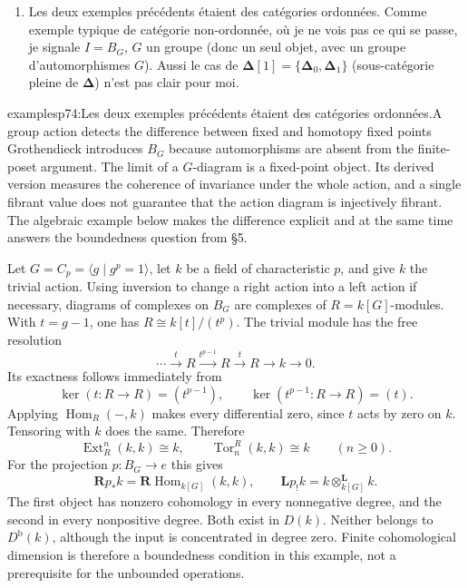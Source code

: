 \begin{enumerate}
\item[\textit{c})] Les deux exemples précédents étaient des catégories ordonnées. Comme exemple typique de catégorie non-ordonnée, où je ne vois pas ce qui se passe, je signale $I = B_G$, $G$ un groupe (donc un seul objet, avec un groupe d'automorphismes $G$). Aussi le cas de $\boldsymbol{\Delta}[1] = \{\boldsymbol{\Delta}_0, \boldsymbol{\Delta}_1\}$ (sous-catégorie pleine de $\boldsymbol{\Delta}$) n'est pas clair pour moi.
\end{enumerate}

\begin{dcomment}{examples}{p74:Les deux exemples précédents étaient des catégories ordonnées.}{A group action detects the difference between fixed and homotopy fixed points}
Grothendieck introduces $B_G$ because automorphisms are absent from the finite-poset argument. The limit of a $G$-diagram is a fixed-point object. Its derived version measures the coherence of invariance under the whole action, and a single fibrant value does not guarantee that the action diagram is injectively fibrant. The algebraic example below makes the difference explicit and at the same time answers the boundedness question from \S5.

Let $G=C_p=\langle g\mid g^p=1\rangle$, let $k$ be a field of characteristic $p$, and give $k$ the trivial action. Using inversion to change a right action into a left action if necessary, diagrams of complexes on $B_G$ are complexes of $R=k[G]$-modules. With $t=g-1$, one has $R\cong k[t]/(t^p)$. The trivial module has the free resolution
\[
 \cdots\xrightarrow{t}R\xrightarrow{t^{p-1}}R
       \xrightarrow{t}R\longrightarrow k\longrightarrow0.
\]
Its exactness follows immediately from
\[
       \ker(t:R\to R)=(t^{p-1}),\qquad
       \ker(t^{p-1}:R\to R)=(t).
\]
Applying $\operatorname{Hom}_R(-,k)$ makes every differential zero, since $t$ acts by zero on $k$. Tensoring with $k$ does the same. Therefore
\[
 \operatorname{Ext}^n_R(k,k)\cong k,
 \qquad \operatorname{Tor}^R_n(k,k)\cong k
 \qquad(n\geq0).
\]
For the projection $p:B_G\to e$ this gives
\[
 \mathbf Rp_*k=\mathbf R\operatorname{Hom}_{k[G]}(k,k),
 \qquad \mathbf Lp_!k=k\otimes^{\mathbf L}_{k[G]}k.
\]
The first object has nonzero cohomology in every nonnegative degree, and the second in every nonpositive degree. Both exist in $D(k)$. Neither belongs to $D^{\mathrm b}(k)$, although the input is concentrated in degree zero. Finite cohomological dimension is therefore a boundedness condition in this example, not a prerequisite for the unbounded operations.


\end{dcomment}
